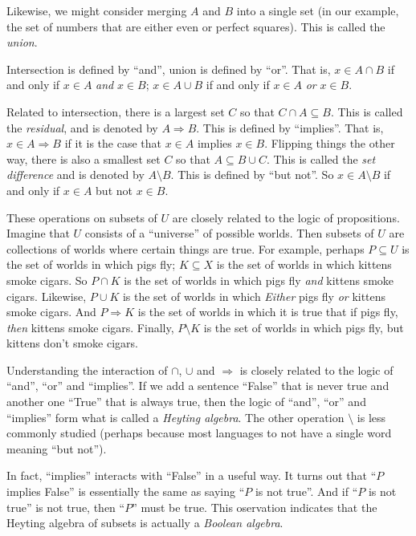 Likewise, we might consider merging $A$ and $B$ into a single set (in our example, the set of numbers that are either even or perfect squares).
This is called the \emph{union}.

Intersection is defined by ``and'', union is defined by ``or''. That is, $x\in A\cap B$ if and only if $x\in A$ \emph{and} $x\in B$;  $x\in A\cup B$  if and only if $x\in A$ \emph{or} $x\in B$.

Related to intersection, there is a largest set $C$ so that $C\cap A\subseteq B$. 
This is called the \emph{residual}, and is denoted by $A\Rightarrow B$. This is defined by ``implies''. That is, $x\in A\Rightarrow B$ if it is the case that $x\in A$ implies $x\in B$. 
Flipping things the other way, there is also a smallest set $C$ so that $A\subseteq B\cup C$. This is called the \emph{set difference} and is denoted by $A\setminus B$. This is defined by ``but not''. So $x\in A\setminus B$ if and only if $x\in A$ but not $x\in B$. 

These operations on subsets of $U$ are closely related to the logic of propositions.
Imagine that $U$ consists of a ``universe'' of possible worlds. Then subsets of $U$ are collections of worlds where certain things are true.
For example, perhaps $P\subseteq U$ is the set of worlds in which pigs fly;
$K\subseteq X$ is the set of worlds in which kittens smoke cigars.
So $P\cap K$ is the set of worlds in which pigs fly \emph{and} kittens smoke cigars.
Likewise, $P\cup K$ is the set of worlds in which \emph{Either} pigs fly \emph{or} kittens smoke cigars.
And $P\Rightarrow K$ is the set of worlds in which it is true that if pigs fly, \emph{then} kittens smoke cigars. Finally, $P\setminus K$ is the set of worlds in which pigs fly, but kittens don't smoke cigars.

Understanding the interaction of $\cap$, $\cup$ and $\Rightarrow$ is closely related to the logic of ``and'', ``or'' and ``implies''. If we add a sentence ``False'' that is never true and another one ``True'' that is always true, then the logic of ``and'', ``or'' and ``implies'' form what is called a \emph{Heyting algebra}. The other operation $\setminus$ is less commonly studied (perhaps because most languages to not have a single word meaning ``but not'').

In fact, ``implies'' interacts with ``False'' in a useful way.
It turns out that ``$P$ implies False'' is essentially the same as saying ``$P$ is not true''. And if ``$P$ is not true'' is not true, then ``$P$'' must be true. This oservation indicates that the Heyting algebra of subsets is actually a \emph{Boolean algebra}.

